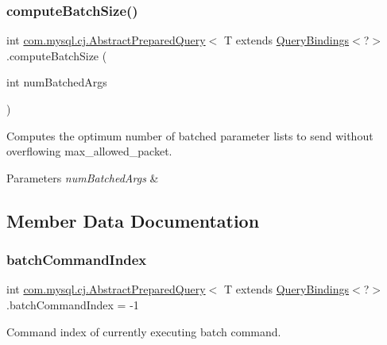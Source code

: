 \subsubsection{\texorpdfstring{compute\+Batch\+Size()}{computeBatchSize()}}
{\footnotesize\ttfamily int \mbox{\hyperlink{classcom_1_1mysql_1_1cj_1_1_abstract_prepared_query}{com.\+mysql.\+cj.\+Abstract\+Prepared\+Query}}$<$ T extends \mbox{\hyperlink{interfacecom_1_1mysql_1_1cj_1_1_query_bindings}{Query\+Bindings}}$<$?$>$.compute\+Batch\+Size (\begin{DoxyParamCaption}\item[{int}]{num\+Batched\+Args }\end{DoxyParamCaption})}

Computes the optimum number of batched parameter lists to send without overflowing max\+\_\+allowed\+\_\+packet.


\begin{DoxyParams}{Parameters}
{\em num\+Batched\+Args} & \\
\hline
\end{DoxyParams}


\subsection{Member Data Documentation}
\mbox{\label{classcom_1_1mysql_1_1cj_1_1_abstract_prepared_query_abf8b65895d25af2ce73ef93f141d8c44}} 
\subsubsection{\texorpdfstring{batch\+Command\+Index}{batchCommandIndex}}
{\footnotesize\ttfamily int \mbox{\hyperlink{classcom_1_1mysql_1_1cj_1_1_abstract_prepared_query}{com.\+mysql.\+cj.\+Abstract\+Prepared\+Query}}$<$ T extends \mbox{\hyperlink{interfacecom_1_1mysql_1_1cj_1_1_query_bindings}{Query\+Bindings}}$<$?$>$.batch\+Command\+Index = -\/1\hspace{0.3cm}{\ttfamily [protected]}}

Command index of currently executing batch command. \mbox{\label{classcom_1_1mysql_1_1cj_1_1_abstract_prepared_query_a06bb5d3e19f687e01fb4274e1f6f4f6a}} 
